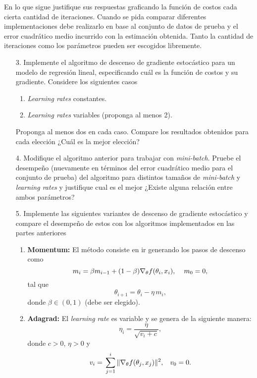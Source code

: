 En lo que sigue justifique sus respuestas graficando la función de costos cada cierta cantidad de iteraciones. Cuando se pida comparar diferentes implementaciones debe realizarlo en base al conjunto de datos de prueba y el error cuadrático medio incurrido con la estimación obtenida. Tanto la cantidad de iteraciones como los parámetros pueden ser escogidos libremente.
\begin{enumerate}
  \item[3.] Implemente el algoritmo de descenso de gradiente estocástico para un modelo de regresión lineal, especificando cuál es la función de costos y su gradiente. Considere los siguientes casos
    \begin{enumerate}
      \item \emph{Learning rates} constantes.
      \item \emph{Learning rates} variables (proponga al menos 2).
    \end{enumerate}
    Proponga al menos dos en cada caso. Compare los resultados obtenidos para cada elección ¿Cuál es la mejor elección?
   
  \item[4.] Modifique el algoritmo anterior para trabajar con \emph{mini-batch}. Pruebe el desempeño (nuevamente en términos del error cuadrático medio para el conjunto de prueba) del algoritmo para distintos tamaños de \emph{mini-batch} y \emph{learning rates} y justifique cual es el mejor ¿Existe alguna relación entre ambos parámetros?
    
  \item[5.] Implemente las siguientes variantes de descenso de gradiente estocástico y compare el desempeño de estos con los algoritmos implementados en las partes anteriores
    \begin{enumerate}
        \item \textbf{Momentum:} El método consiste en ir generando los pasos de descenso como
          \[m_{i} = \beta m_{i-1} + (1-\beta)\nabla_{\theta}f(\theta_i,x_{i}),\hspace{0.4cm}m_0 = 0, \]
        tal que
        \[\theta_{i+1} = \theta_i -\eta\, m_i,\]
        donde $\beta\in(0,1)$ (debe ser elegido).
      \item \textbf{Adagrad:} El \emph{learning rate} es variable y se genera de la siguiente manera:
          \[\eta_{i} = \frac{\eta}{\sqrt{v_{i
          } + c}}, \]
        donde $c>0$, $\eta>0$ y 
        \begin{align*}
          v_{i} ={}& \sum_{j = 1}^{i}\|\nabla_{\theta}f(\theta_j,x_j)\|^2, \hspace{0.3cm}v_0 = 0.\\
        \end{align*}
    \end{enumerate}
    
\end{enumerate}